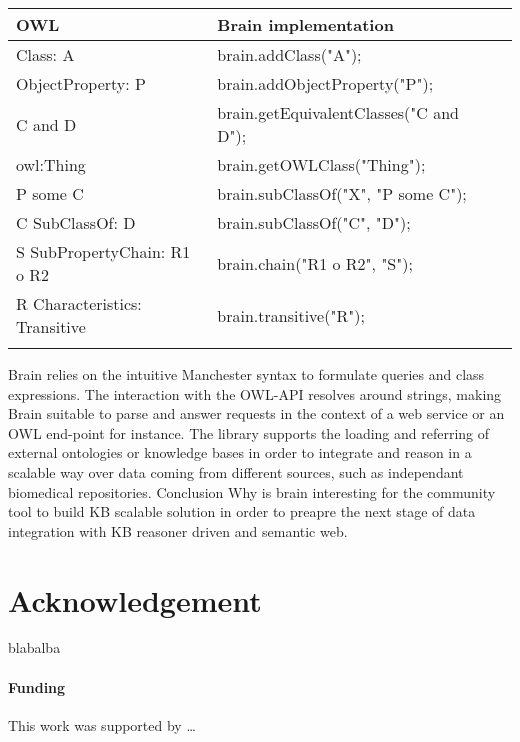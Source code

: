 \documentclass{bioinfo}
\begin{document}
\begin{table}[!h]
{\begin{tabular}{llll}\toprule
OWL & Brain implementation\\\midrule
Class: A & brain.addClass("A");\\
ObjectProperty: P & brain.addObjectProperty("P");\\
C and D & brain.getEquivalentClasses("C and D");\\
owl:Thing & brain.getOWLClass("Thing");\\
P some C & brain.subClassOf("X", "P some C");\\
C SubClassOf: D & brain.subClassOf("C", "D");\\
S SubPropertyChain: R1 o R2 & brain.chain("R1 o R2", "S");\\
R Characteristics: Transitive & brain.transitive("R");\\\botrule
\end{tabular}}{}
\end{table}

Brain relies on the intuitive Manchester syntax to formulate queries and class expressions. The interaction with the OWL-API
resolves around strings, making Brain suitable to parse and answer requests in the context of a web service or an OWL end-point for instance.
The library supports the loading and referring of external ontologies or knowledge bases in order to integrate and reason in a 
scalable way over data coming from different sources, such as independant biomedical repositories.
Conclusion
Why is brain interesting for the community
tool to build KB scalable solution in order to preapre the next stage of data integration with KB reasoner driven and semantic web.


\section*{Acknowledgement}
blabalba
\paragraph{Funding\textcolon}
This work was supported by …
 









\end{document}
